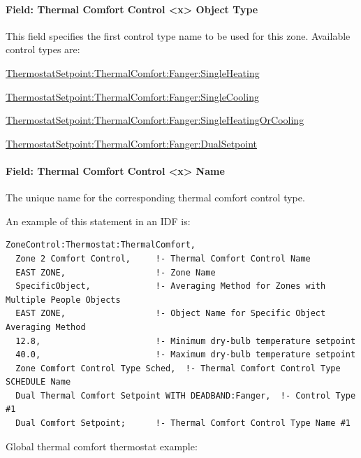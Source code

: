 \paragraph{Field: Thermal Comfort Control \textless{}x\textgreater{} Object Type}\label{field-thermal-comfort-control-x-object-type}

This field specifies the first control type name to be used for this zone. Available control types are:

\hyperref[thermostatsetpointthermalcomfortfangersingleheating]{ThermostatSetpoint:ThermalComfort:Fanger:SingleHeating}

\hyperref[thermostatsetpointthermalcomfortfangersinglecooling]{ThermostatSetpoint:ThermalComfort:Fanger:SingleCooling}

\hyperref[thermostatsetpointthermalcomfortfangersingleheatingorcooling]{ThermostatSetpoint:ThermalComfort:Fanger:SingleHeatingOrCooling}

\hyperref[thermostatsetpointthermalcomfortfangerdualsetpoint]{ThermostatSetpoint:ThermalComfort:Fanger:DualSetpoint}

\paragraph{Field: Thermal Comfort Control \textless{}x\textgreater{} Name}\label{field-thermal-comfort-control-x-name}

The unique name for the corresponding thermal comfort control type.

An example of this statement in an IDF is:

\begin{lstlisting}
ZoneControl:Thermostat:ThermalComfort,
  Zone 2 Comfort Control,     !- Thermal Comfort Control Name
  EAST ZONE,                  !- Zone Name
  SpecificObject,             !- Averaging Method for Zones with Multiple People Objects
  EAST ZONE,                  !- Object Name for Specific Object Averaging Method
  12.8,                       !- Minimum dry-bulb temperature setpoint
  40.0,                       !- Maximum dry-bulb temperature setpoint
  Zone Comfort Control Type Sched,  !- Thermal Comfort Control Type SCHEDULE Name
  Dual Thermal Comfort Setpoint WITH DEADBAND:Fanger,  !- Control Type #1
  Dual Comfort Setpoint;      !- Thermal Comfort Control Type Name #1
\end{lstlisting}

Global thermal comfort thermostat example:

